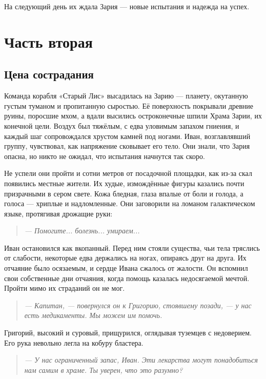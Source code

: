 \documentclass[12pt,a4paper]{book}
\newenvironment{dialogue}{\begin{quote}\itshape}{\end{quote}} %
\begin{document}
На следующий день их ждала Зария --- новые испытания и надежда на успех.

\part{Часть вторая}

\chapter{Цена сострадания}

Команда корабля «Старый Лис» высадилась на Зарию --- планету, окутанную густым туманом и пропитанную сыростью. Её поверхность покрывали древние руины, поросшие мхом, а вдали высились остроконечные шпили Храма Зарии, их конечной цели. Воздух был тяжёлым, с едва уловимым запахом гниения, и каждый шаг сопровождался хрустом камней под ногами. Иван, возглавлявший группу, чувствовал, как напряжение сковывает его тело. Они знали, что Зария опасна, но никто не ожидал, что испытания начнутся так скоро.

Не успели они пройти и сотни метров от посадочной площадки, как из-за скал появились местные жители. Их худые, измождённые фигуры казались почти призрачными в сером свете. Кожа бледная, глаза впалые от боли и голода, а голоса --- хриплые и надломленные. Они заговорили на ломаном галактическом языке, протягивая дрожащие руки:

\begin{dialogue}
--- Помогите... болезнь... умираем...
\end{dialogue}

Иван остановился как вкопанный. Перед ним стояли существа, чьи тела тряслись от слабости, некоторые едва держались на ногах, опираясь друг на друга. Их отчаяние было осязаемым, и сердце Ивана сжалось от жалости. Он вспомнил свои собственные дни отчаяния, когда помощь казалась недосягаемой мечтой. Пройти мимо их страданий он не мог.

\begin{dialogue}
--- Капитан, --- повернулся он к Григорию, стоявшему позади, --- у нас есть медикаменты. Мы можем им помочь.
\end{dialogue}

Григорий, высокий и суровый, прищурился, оглядывая туземцев с недоверием. Его рука невольно легла на кобуру бластера.

\begin{dialogue}
--- У нас ограниченный запас, Иван. Эти лекарства могут понадобиться нам самим в храме. Ты уверен, что это разумно?
\end{dialogue}
\end{document}
